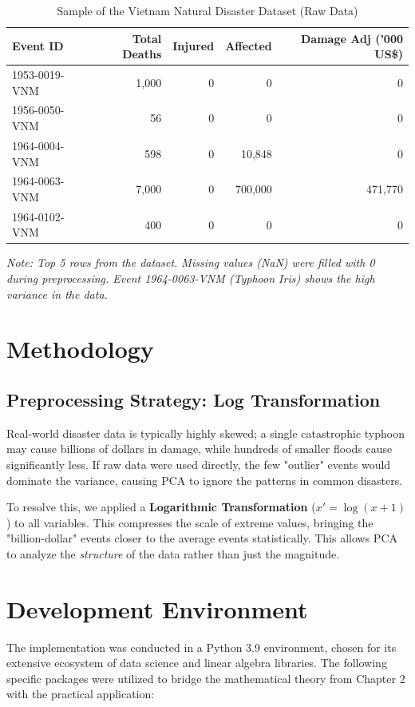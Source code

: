 \documentclass[12pt, a4paper]{report}
\begin{document}
\begin{table}[h]
    \centering
    \caption{Sample of the Vietnam Natural Disaster Dataset (Raw Data)}
    \label{tab:dataset_sample}
    \begin{tabular}{lrrrr}
        \toprule
        \textbf{Event ID} & \textbf{Total Deaths} & \textbf{Injured} & \textbf{Affected} & \textbf{Damage Adj ('000 US\$)} \\
        \midrule
        1953-0019-VNM & 1,000 & 0 & 0 & 0 \\
        1956-0050-VNM & 56 & 0 & 0 & 0 \\
        1964-0004-VNM & 598 & 0 & 10,848 & 0 \\
        1964-0063-VNM & 7,000 & 0 & 700,000 & 471,770 \\
        1964-0102-VNM & 400 & 0 & 0 & 0 \\
        \bottomrule
    \end{tabular}
    \vspace{0.2cm}
    
    \small{\textit{Note: Top 5 rows from the dataset. Missing values (NaN) were filled with 0 during preprocessing. Event 1964-0063-VNM (Typhoon Iris) shows the high variance in the data.}}
\end{table}

\section{Methodology}

\subsection{Preprocessing Strategy: Log Transformation}
Real-world disaster data is typically highly skewed; a single catastrophic typhoon may cause billions of dollars in damage, while hundreds of smaller floods cause significantly less. If raw data were used directly, the few "outlier" events would dominate the variance, causing PCA to ignore the patterns in common disasters.

To resolve this, we applied a \textbf{Logarithmic Transformation} ($x' = \log(x+1)$) to all variables. This compresses the scale of extreme values, bringing the "billion-dollar" events closer to the average events statistically. This allows PCA to analyze the \textit{structure} of the data rather than just the magnitude.

\section{Development Environment}
The implementation was conducted in a Python 3.9 environment, chosen for its extensive ecosystem of data science and linear algebra libraries. The following specific packages were utilized to bridge the mathematical theory from Chapter 2 with the practical application:
\end{document}
